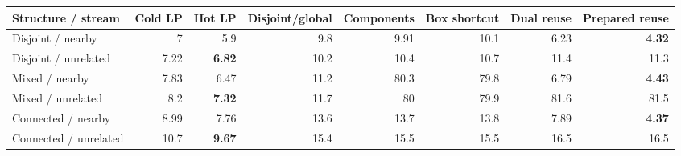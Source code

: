 \begingroup\fontsize{8}{9.4}\selectfont\setlength{\tabcolsep}{3.5pt}
\begin{tabular*}{\textwidth}{@{\extracolsep{\fill}}lrrrrrrr@{}}
\toprule
Structure / stream & Cold LP & Hot LP & Disjoint/global & Components & Box shortcut & Dual reuse & Prepared reuse\\
\midrule
Disjoint / nearby & 7 & 5.9 & 9.8 & 9.91 & 10.1 & 6.23 & \textbf{4.32}\\
Disjoint / unrelated & 7.22 & \textbf{6.82} & 10.2 & 10.4 & 10.7 & 11.4 & 11.3\\
Mixed / nearby & 7.83 & 6.47 & 11.2 & 80.3 & 79.8 & 6.79 & \textbf{4.43}\\
Mixed / unrelated & 8.2 & \textbf{7.32} & 11.7 & 80 & 79.9 & 81.6 & 81.5\\
Connected / nearby & 8.99 & 7.76 & 13.6 & 13.7 & 13.8 & 7.89 & \textbf{4.37}\\
Connected / unrelated & 10.7 & \textbf{9.67} & 15.4 & 15.5 & 15.5 & 16.5 & 16.5\\
\bottomrule
\end{tabular*}
\endgroup
